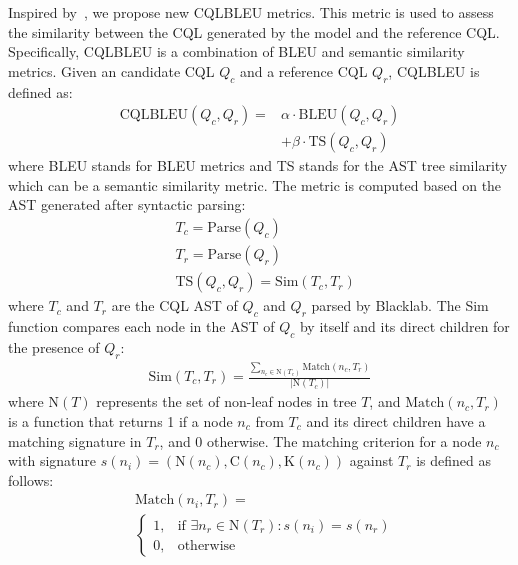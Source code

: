 \documentclass[11pt]{article}
\begin{document}
\begin{CJK*}{UTF8}{gbsn}
Inspired by~\citet{ren2020codebleu}, we propose new CQLBLEU metrics. This metric is used to assess the similarity between the CQL generated by the model and the reference CQL. Specifically, CQLBLEU is a combination of BLEU\citep{papineni2002bleu} and semantic similarity metrics. Given an candidate CQL $Q_{c}$ and a reference CQL $Q_{r}$, CQLBLEU is defined as:
\begin{equation}
\begin{aligned}
\text{CQLBLEU}(Q_{c},Q_{r}) =& \alpha\cdot \text{BLEU}(Q_{c},Q_{r}) \\ &+ \beta\cdot \text{TS}(Q_{c},Q_{r})
\end{aligned}
\end{equation}
where BLEU stands for BLEU metrics and TS stands for the AST tree similarity which can be a semantic similarity metric. The metric is computed based on the AST generated after syntactic parsing:
\begin{align}
    &T_c = \text{Parse}(Q_{c}) \\
    &T_r = \text{Parse}(Q_r) \\
    &\text{TS}(Q_{c},Q_{r}) = \text{Sim}(T_c,T_r) 
\end{align}
where $T_c$ and $T_r$ are the CQL AST of $Q_{c}$ and $Q_r$ parsed by Blacklab. The Sim function compares each node in the AST of $Q_{c}$ by itself and its direct children for the presence of $Q_r$:
\begin{align}
    \text{Sim}(T_c, T_r)=     \frac{\sum_{n_c \in \text{N}(T_c)} \text{Match}(n_c, T_r)}{|\text{N}(T_c)|}
\end{align}
where $\text{N}(T)$ represents the set of non-leaf nodes in tree $T$, and $\text{Match}(n_c, T_r)$ is a function that returns 1 if a node $n_c$ from $T_c$ and its direct children have a matching signature in $T_r$, and 0 otherwise. The matching criterion for a node $n_c$ with signature $s(n_i) = (\text{N}(n_c), \text{C}(n_c), \text{K}(n_c))$ against $T_r$ is defined as follows:
\begin{equation}
\begin{aligned}
    & \text{Match}(n_i, T_r) = \\ &\begin{cases}
    1, & \text{if } \exists n_r \in \text{N}(T_r) : s(n_i) = s(n_r) \\
    0, & \text{otherwise}
    \end{cases}
\end{aligned}
\end{equation}


\end{CJK*}
\end{document}
